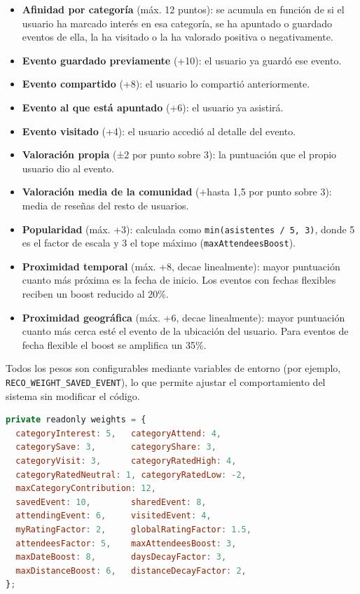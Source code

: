 \begin{itemize}
    \item \textbf{Afinidad por categoría} (máx. 12 puntos): se acumula en función de si el usuario ha marcado interés en esa categoría, se ha apuntado o guardado eventos de ella, la ha visitado o la ha valorado positiva o negativamente.
    \item \textbf{Evento guardado previamente} (+10): el usuario ya guardó ese evento.
    \item \textbf{Evento compartido} (+8): el usuario lo compartió anteriormente.
    \item \textbf{Evento al que está apuntado} (+6): el usuario ya asistirá.
    \item \textbf{Evento visitado} (+4): el usuario accedió al detalle del evento.
    \item \textbf{Valoración propia} (±2 por punto sobre 3): la puntuación que el propio usuario dio al evento.
    \item \textbf{Valoración media de la comunidad} (+hasta 1,5 por punto sobre 3): media de reseñas del resto de usuarios.
    \item \textbf{Popularidad} (máx. +3): calculada como \texttt{min(asistentes / 5, 3)}, donde 5 es el factor de escala y 3 el tope máximo (\texttt{maxAttendeesBoost}).
    \item \textbf{Proximidad temporal} (máx. +8, decae linealmente): mayor puntuación cuanto más próxima es la fecha de inicio. Los eventos con fechas flexibles reciben un boost reducido al 20\%.
    \item \textbf{Proximidad geográfica} (máx. +6, decae linealmente): mayor puntuación cuanto más cerca esté el evento de la ubicación del usuario. Para eventos de fecha flexible el boost se amplifica un 35\%.
\end{itemize}

Todos los pesos son configurables mediante variables de entorno (por ejemplo, \texttt{RECO\_WEIGHT\_SAVED\_EVENT}), lo que permite ajustar el comportamiento del sistema sin modificar el código.

\begin{lstlisting}[language=JavaScript, caption={Pesos del sistema de recomendaciones (valores por defecto)}]
private readonly weights = {
  categoryInterest: 5,   categoryAttend: 4,
  categorySave: 3,       categoryShare: 3,
  categoryVisit: 3,      categoryRatedHigh: 4,
  categoryRatedNeutral: 1, categoryRatedLow: -2,
  maxCategoryContribution: 12,
  savedEvent: 10,        sharedEvent: 8,
  attendingEvent: 6,     visitedEvent: 4,
  myRatingFactor: 2,     globalRatingFactor: 1.5,
  attendeesFactor: 5,    maxAttendeesBoost: 3,
  maxDateBoost: 8,       daysDecayFactor: 3,
  maxDistanceBoost: 6,   distanceDecayFactor: 2,
};
\end{lstlisting}

